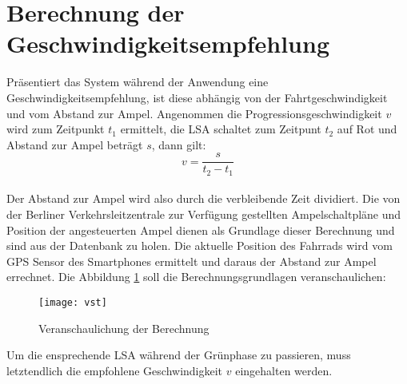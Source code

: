 \section{\label{sec:mathGrundlagen}Berechnung der Geschwindigkeitsempfehlung}
Präsentiert das System während der Anwendung eine Geschwindigkeitsempfehlung, ist diese abhängig von der Fahrtgeschwindigkeit und vom Abstand zur Ampel. Angenommen die Progressionsgeschwindigkeit $v$ wird zum Zeitpunkt $t_{1}$ ermittelt, die \gls {LSA} schaltet zum Zeitpunt $t_{2}$ auf Rot und Abstand zur Ampel beträgt $s$, dann gilt: \\
\[ v = \frac{s}{t_{2} - t_{1}} \] \\
Der Abstand zur Ampel wird also durch die verbleibende Zeit dividiert. 
Die von der Berliner Verkehrsleitzentrale zur Verfügung gestellten Ampelschaltpläne und Position der angesteuerten Ampel dienen als Grundlage dieser Berechnung und sind aus der Datenbank zu holen. Die aktuelle Position des Fahrrads wird vom \gls{GPS} Sensor des \glspl{Smartphone} ermittelt und daraus der Abstand zur Ampel errechnet. Die Abbildung \ref{fig:vst} soll die Berechnungsgrundlagen veranschaulichen: 
\begin{figure}[H]  
    \centering  
    \texttt{[image: vst]}     
    \caption[Berechnung Progressionsgeschwindigkeit]{Veranschaulichung der Berechnung}
    \label{fig:vst}
\end{figure}
Um die ensprechende \gls{LSA} während der Grünphase zu passieren, muss letztendlich die empfohlene Geschwindigkeit $v$ eingehalten werden.
